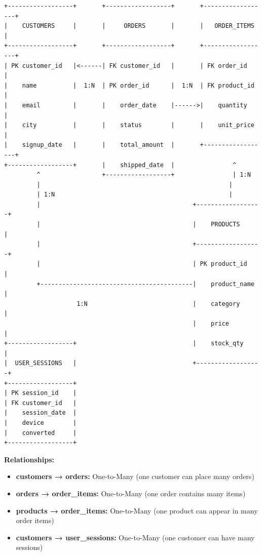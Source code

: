 \documentclass[12pt,a4paper]{article}
\begin{document}
\begin{tcolorbox}[colback=white,colframe=primaryblue,title=ER Diagram,coltitle=white]
\footnotesize
\begin{verbatim}
+------------------+       +------------------+       +------------------+
|    CUSTOMERS     |       |     ORDERS       |       |   ORDER_ITEMS    |
+------------------+       +------------------+       +------------------+
| PK customer_id   |<------| FK customer_id   |       | FK order_id      |
|    name          |  1:N  | PK order_id      |  1:N  | FK product_id    |
|    email         |       |    order_date    |------>|    quantity      |
|    city          |       |    status        |       |    unit_price    |
|    signup_date   |       |    total_amount  |       +------------------+
+------------------+       |    shipped_date  |                ^
         ^                 +------------------+                | 1:N
         |                                                    |
         | 1:N                                                |
         |                                          +------------------+
         |                                          |    PRODUCTS      |
         |                                          +------------------+
         |                                          | PK product_id    |
         +------------------------------------------|    product_name  |
                    1:N                             |    category      |
                                                    |    price         |
+------------------+                                |    stock_qty     |
|  USER_SESSIONS   |                                +------------------+
+------------------+
| PK session_id    |
| FK customer_id   |
|    session_date  |
|    device        |
|    converted     |
+------------------+
\end{verbatim}
\end{tcolorbox}

\textbf{Relationships:}
\begin{itemize}[leftmargin=*,noitemsep,topsep=3pt]
    \item \textbf{customers → orders:} One-to-Many (one customer can place many orders)
    \item \textbf{orders → order\_items:} One-to-Many (one order contains many items)
    \item \textbf{products → order\_items:} One-to-Many (one product can appear in many order items)
    \item \textbf{customers → user\_sessions:} One-to-Many (one customer can have many sessions)
\end{itemize}
\end{document}
